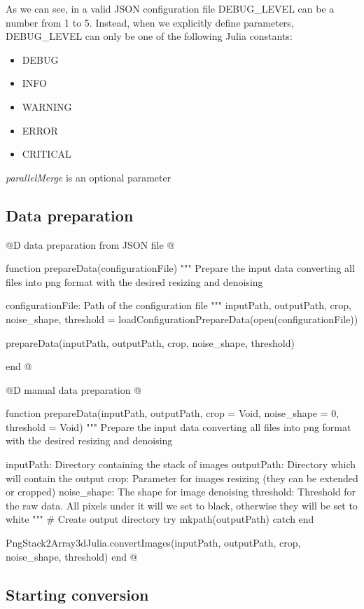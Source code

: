 \documentclass[11pt,oneside]{article}	%
\begin{document}
As we can see, in a valid JSON configuration file DEBUG\_LEVEL can be a number from 1 to 5. Instead, when we explicitly define parameters, DEBUG\_LEVEL can only be one of the following Julia constants:

\begin{itemize}
 \item DEBUG
 \item INFO
 \item WARNING
 \item ERROR
 \item CRITICAL
\end{itemize}

\textit{parallelMerge} is an optional parameter


\subsection{Data preparation}\label{sec:dataPreparation}

@D data preparation from JSON file
@{function prepareData(configurationFile)
  """
  Prepare the input data converting all files into png
  format with the desired resizing and denoising

  configurationFile: Path of the configuration file
  """
  inputPath, outputPath, crop,
	  noise_shape, threshold = loadConfigurationPrepareData(open(configurationFile))

  prepareData(inputPath, outputPath, crop, noise_shape, threshold)
      
end
@}

@D manual data preparation
@{function prepareData(inputPath, outputPath,
		       crop = Void, noise_shape = 0, threshold = Void)
  """
  Prepare the input data converting all files into png
  format with the desired resizing and denoising

  inputPath: Directory containing the stack of images
  outputPath: Directory which will contain the output
  crop: Parameter for images resizing (they can be
        extended or cropped)
  noise_shape: The shape for image denoising
  threshold: Threshold for the raw data. All pixels under it
             will we set to black, otherwise they will be set to white
  """
  # Create output directory
  try
    mkpath(outputPath)
  catch
  end

  PngStack2Array3dJulia.convertImages(inputPath, outputPath, crop, noise_shape, threshold)
end
@}

\subsection{Starting conversion}\label{sec:conversion}
\end{document}
